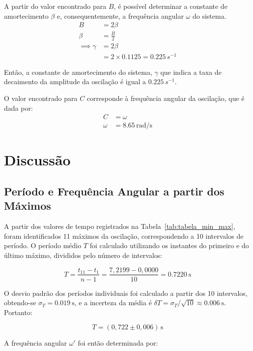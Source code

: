 \documentclass[12pt,a4paper]{article}
\begin{document}
A partir do valor encontrado para $B$, é possível determinar a constante de amortecimento $\beta$ e, consequentemente, a frequência angular $\omega$ do sistema.
\begin{align*}
    B &= 2\beta \\
    \beta &= \frac{B}{2}\\ 
    \implies \gamma &= 2\beta \\
    &= 2 \times 0.1125 = 0.225 \, s^{-1}
\end{align*}

Então, a constante de amortecimento do sistema, $\gamma$ que indica a taxa de decaimento da amplitude da oscilação é igual a $0.225 \, s^{-1}$.

O valor encontrado para $C$ corresponde à frequência angular da oscilação, que é dada por:
\begin{align*}
    C &= \omega \\
    \omega &= 8.65 \, \text{rad/s}
\end{align*}

\section{Discussão}

\subsection{Período e Frequência Angular a partir dos Máximos}

A partir dos valores de tempo registrados na Tabela~\ref{tab:tabela_min_max}, foram identificados 11 máximos da oscilação, correspondendo a 10 intervalos de período. O período médio $T$ foi calculado utilizando os instantes do primeiro e do último máximo, divididos pelo número de intervalos:

\begin{equation}
    T = \frac{t_{11} - t_1}{n-1} = \frac{7{,}2199 - 0{,}0000}{10} = \SI{0,7220}{\second}
\end{equation}

O desvio padrão dos períodos individuais foi calculado a partir dos 10 intervalos, obtendo-se $\sigma_T = \SI{0,019}{\second}$, e a incerteza da média é $\delta T = \sigma_T / \sqrt{10} \approx \SI{0,006}{\second}$. Portanto:

\begin{equation}
    T = (0{,}722 \pm 0{,}006)\,\si{\second}
\end{equation}

A frequência angular $\omega'$ foi então determinada por:
\end{document}
